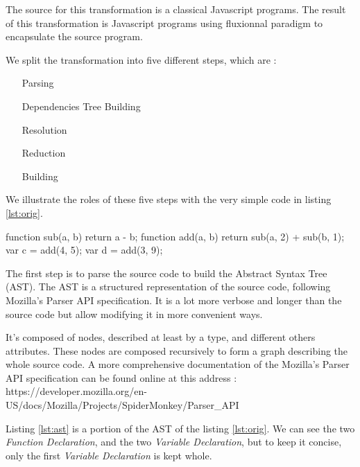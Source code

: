 The source for this transformation is a classical Javascript programs.
The result of this transformation is Javascript programs using fluxionnal paradigm to encapsulate the source program.

We split the transformation into five different steps, which are : 
\begin{itemize}
\item[Parsing]
\item[Dependencies Tree Building]
\item[Resolution]
\item[Reduction]
\item[Building]
\end{itemize}

We illustrate the roles of these five steps with the very simple code in listing \ref{lst:orig}.

\begin{code}[Javascript, caption={Original code},label={lst:orig}]
function sub(a, b) {
  return a - b;
}
function add(a, b) {
  return sub(a, 2) + sub(b, 1);
}
var c = add(4, 5);
var d = add(3, 9);
\end{code}



The first step is to parse the source code to build the Abstract Syntax Tree (AST).
The AST is a structured representation of the source code, following Mozilla's Parser API specification.
It is a lot more verbose and longer than the source code but allow modifying it in more convenient ways.

It's composed of nodes, described at least by a type, and different others attributes.
These nodes are composed recursively to form a graph describing the whole source code.
A more comprehensive documentation of the Mozilla's Parser API specification can be found online at this address : https://developer.mozilla.org/en-US/docs/Mozilla/Projects/SpiderMonkey/Parser\_API

Listing \ref{lst:ast} is a portion of the AST of the listing \ref{lst:orig}.
We can see the two \textit{Function Declaration}, and the two \textit{Variable Declaration}, but to keep it concise, only the first \textit{Variable Declaration} is kept whole.

